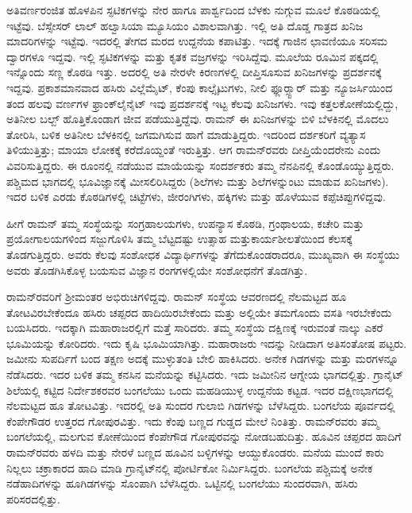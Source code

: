 ಅತಿವರ್ಣರಂಜಿತ ಹೊಳಪಿನ ಸ್ಫಟಿಕಗಳನ್ನು ನೇರ ಹಾಗೂ ಪಾರ್ಶ್ವದಿಂದ ಬೆಳಕು ನುಗ್ಗುವ ಮೂಲೆ ಕೊಠಡಿಯಲ್ಲಿ ಇಟ್ಟೆವು. ಬೆಸ್ಸೇಸರ್ ಲಾಲ್ ಹಲ್ವಾಸಿಯಾ ಮ್ಯೂಸಿಯಂ ವಿಶಾಲವಾಗಿತ್ತು. ಇಲ್ಲಿ ಅತಿ ದೊಡ್ಡ ಗಾತ್ರದ ಖನಿಜ ಮಾದರಿಗಳನ್ನು ಇಟ್ಟೆವು. ಇದರಲ್ಲಿ ತೇಗದ ಮರದ ಉದ್ದನೆಯ ಕಪಾಟಿತ್ತು. ಇದಕ್ಕೆ ಗಾಜಿನ ಛಾವಣಿಯೂ ಸರಿಸಮ ದ್ವಾರಗಳೂ ಇದ್ದವು. ಇಲ್ಲಿ ಸ್ಫಟಿಕಗಳನ್ನು ಮತ್ತು ಕೃತಕ ವಜ್ರಗಳನ್ನು ಇರಿಸಿದ್ದೆವು. ಮೂಲೆಯ ರೂಮಿನ ಪಕ್ಕದಲ್ಲಿ ಇನ್ನೊಂದು ಸಣ್ಣ ಕೊಠಡಿ ಇತ್ತು. ಅದರಲ್ಲಿ ಅತಿ ನೇರಳೇ ಕಿರಣಗಳಲ್ಲಿ ದೀಪ್ತಿಸೂಸುವ ಖನಿಜಗಳನ್ನು ಪ್ರದರ್ಶನಕ್ಕೆ ಇದ್ದವು. ಪ್ರಕಾಶಮಾನವಾದ ಹಸಿರು ವಿಲ್ಲೆಮೈಟ್, ಕೆಂಪು ಕಾಲ್ಸೈಟುಗಳು, ನೀಲಿ ಫ್ಲೂರ್‍ಸ್ಟಾರ್ ಮತ್ತು ನ್ಯೂಜರ್ಸಿಯಿಂದ ತಂದ ಹಲವು ವರ್ಣಗಳ ಫ್ರಾಂಕ್‍ಲೈನೈಟ್ ಇವು ಪ್ರದರ್ಶನಕ್ಕೆ ಇಟ್ಟ ಕೆಲವು ಖನಿಜಗಳು. ಇವು ಕತ್ತಲಕೋಣೆಯಲ್ಲಿದ್ದು, ಅತಿನೀಲ ಬಲ್ಬ್ ಹೊತ್ತಿಕೊಂಡಾಗ ಜೀವ ಪಡೆಯುತ್ತಿದ್ದೆವು. ರಾಮನ್ ಈ ಖನಿಜಗಳನ್ನು ಬಿಳಿ ಬೆಳಕಿನಲ್ಲಿ ಮೊದಲು ತೋರಿಸಿ, ಬಳಿಕ ಅತಿನೀಲ ಬೆಳಕಿನಲ್ಲಿ ಜಗಮಗಿಸುವ ಹಾಗೆ ಮಾಡುತ್ತಿದ್ದರು. ಇದರಿಂದ ದರ್ಶಕರಿಗೆ ವ್ಯತ್ಯಾಸ ತಿಳಿಯುತ್ತಿತ್ತು; ಮಾಯಾ ಲೋಕಕ್ಕೆ ಕರೆದೊಯ್ದಂತೆ ಇರುತ್ತಿತ್ತು. ಆಗ ರಾಮನ್‍ರವರು ದೀಪ್ತಿಯೆಂದರೇನು ಎಂದು ವಿವರಿಸುತ್ತಿದ್ದರು. ಈ ರೂಂನಲ್ಲಿ ನಡೆಯುವ ಮಾಯೆಯನ್ನು ಸಂದರ್ಶಕರು ತಮ್ಮ ನೆನಪಿನಲ್ಲಿ ಕೊಂಡೊಯ್ಯುತ್ತಿದ್ದರು. ಪಶ್ಚಿಮದ ಭಾಗದಲ್ಲಿ ಭೂವಿಜ್ಞಾನಕ್ಕೆ ಮೀಸಲಿರಿಸಿದ್ದರು (ಶಿಲೆಗಳು ಮತ್ತು ಶಿಲೆಗಳನ್ನುಂಟು ಮಾಡುವ ಖನಿಜಗಳು). ಇದರ ಬಳಿಕ ಎರಡು ಕೊಠಡಿಗಳಲ್ಲಿ ಚಿಟ್ಟೆಗಳು, ಜೀರಂಗಿಗಳು, ಹಕ್ಕಿಗಳು ಮತ್ತು ಹೊಳೆಯುವ ಕಪ್ಪೆಚಿಪ್ಪುಗಳಿದ್ದವು.

ಹೀಗೆ ರಾಮನ್ ತಮ್ಮ ಸಂಸ್ಥೆಯನ್ನು ಸಂಗ್ರಹಾಲಯಗಳು, ಉಪನ್ಯಾಸ ಕೊಠಡಿ, ಗ್ರಂಥಾಲಯ, ಕಚೇರಿ ಮತ್ತು ಪ್ರಯೋಗಾಲಯಗಳಿಂದ ಸಜ್ಜುಗೊಳಿಸಿ ತಮ್ಮ ಬೆಟ್ಟದಷ್ಟು ಉತ್ಸಾಹ ಮತ್ತು\break ಕಾರ್ಯಶೀಲತೆಯಿಂದ ಕೆಲಸಕ್ಕೆ ತೊಡಗುತ್ತಿದ್ದರು. ಅವರು ಕೆಲವು ಸಂಶೋಧಕ ವಿದ್ಯಾರ್ಥಿಗಳನ್ನು ತೆಗೆದುಕೊಂಡರಾದರೂ, ಮುಖ್ಯವಾಗಿ ಈ ಸಂಸ್ಥೆಯು ಅವರು ತೊಡಗಿಸಿಕೊಳ್ಳ ಬಯಸುವ ವಿಜ್ಞಾನ ರಂಗಗಳಲ್ಲಿಯೇ ಸಂಶೋಧನೆಗೆ ತೊಡಗಿತ್ತು.

ರಾಮನ್‍ರವರಿಗೆ ಶ‍್ರೀಮಂತರ ಅಭಿರುಚಿಗಳಿದ್ದವು. ರಾಮನ್ ಸಂಸ್ಥೆಯ ಆವರಣದಲ್ಲಿ ನೆಲಮಟ್ಟದ ಹೂ ತೋಟವಿರಬೇಕೆಂದೂ ಹಸಿರು ಚಪ್ಪರದ ಹಾದಿಯಿರಬೇಕೆಂದು ಮತ್ತು ಅಲ್ಲಿಯೇ ತಮಗೊಂದು ವಸತಿ ಇರಬೇಕೆಂದು ಬಯಸಿದರು. ಇದಕ್ಕಾಗಿ ಮಹಾರಾಜರಲ್ಲಿಗೆ ಮತ್ತೆ ಸಾರಿದರು. ತಮ್ಮ ಸಂಸ್ಥೆಯ ದಕ್ಷಿಣಕ್ಕೆ ಇರುವಂತೆ ನಾಲ್ಕು ಎಕರೆ ಭೂಮಿಯನ್ನು ಕೋರಿದರು. ಇದು ಕೃಷಿ ಭೂಮಿಯಾಗಿತ್ತು. ಮಹಾರಾಜರು ಇದನ್ನು ನೀಡಿದಾಗ ಅತಿಸಂತೋಷ ಪಟ್ಟರು. ಜಮೀನು ಸುಪರ್ದಿಗೆ ಬಂದ ತಕ್ಷಣ ಅದಕ್ಕೆ ಮುಳ್ಳುತಂತಿ ಬೇಲಿ ಹಾಕಿಸಿದರು. ಅನೇಕ ಗಿಡಗಳನ್ನು ಮತ್ತು ಮರಗಳನ್ನೂ ನೆಡೆಸಿದರು. ಇದರ ಬಳಿಕ ತಮ್ಮ ಕನಸಿನ ಮನೆಯನ್ನು ಕಟ್ಟಿಸಿದರು. ಇದು ಜಮೀನಿನ ಆಗ್ನೇಯ ಭಾಗದಲ್ಲಿತ್ತು. ಗ್ರಾನೈಟ್ ಶಿಲೆಯಲ್ಲಿ ಕಟ್ಟಿದ ನಿರ್ದೇಶಕರವರ ಬಂಗಲೆಯು ಒಂದು ಮಹಡಿಯುಳ್ಳ ಉದ್ದನೆಯ ಕಟ್ಟಡ. ಇದರ ದಕ್ಷಿಣಭಾಗದಲ್ಲಿ ನೆಲಮಟ್ಟದ ಹೂ ತೋಟವಿತ್ತು. ಇದರಲ್ಲಿ ಅತಿ ಸುಂದರ ಗುಲಾಬಿ ಗಿಡಗಳನ್ನು ಬೆಳೆಸಿದ್ದರು. ಬಂಗಲೆಯ ಪೂರ್ವದಲ್ಲಿ ಕೆಂಪೇಗೌಡರ ಉತ್ತರದ ಗೋಪುರವಿತ್ತು. ಇದು ಕೆಂಪು ಬಣ್ಣದ ಗುಡ್ಡದ ಮೇಲೆ ನಿಂತಿತ್ತು. ರಾಮನ್‍ರವರು ತಮ್ಮ ಬಂಗಲೆಯಲ್ಲಿ, ಮಲಗುವ ಕೋಣೆಯಿಂದ ಕೆಂಪೇಗೌಡ ಗೋಪುರವನ್ನು ನೋಡಬಹುದಿತ್ತು. ಹೂವಿನ ಚಪ್ಪರದ ಹಾದಿಗೆ ರಾಮನ್‍ರವರು ಹಳದಿ ಮತ್ತು ನೇರಳೆ ಬಣ್ಣದ ಹೂವಿನ ಬಳ್ಳಿಗಳನ್ನು ಆಯ್ದುಕೊಂಡರು. ಮನೆಯ ಮುಂದೆ ಕಾರು ನಿಲ್ಲಲು ಚಕ್ರಾಕಾರದ ಹಾದಿ ಮಾಡಿ ಗ್ರಾನೈಟ್‍ನಲ್ಲಿ ಪೋರ್ಟಿಕೋ ನಿರ್ಮಿಸಿದ್ದರು. ಬಂಗಲೆಯ ಪಶ್ಚಿಮಕ್ಕೆ ಅನೇಕ ನಡೆಹಾದಿಗಳನ್ನು ಹೂಗಿಡಗಳನ್ನು ಸೊಂಪಾಗಿ ಬೆಳೆಸಿದ್ದರು. ಒಟ್ಟಿನಲ್ಲಿ ಬಂಗಲೆಯು ಸುಂದರವಾಗಿ, ಹಸಿರು ಪರಿಸರದಲ್ಲಿತ್ತು.

